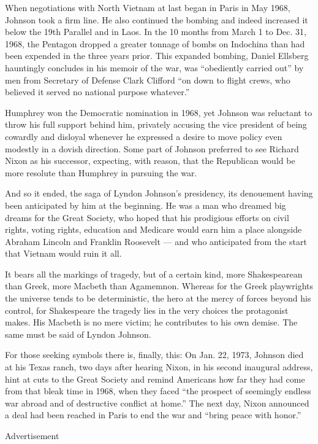 When negotiations with North Vietnam at last began in Paris in May 1968,
Johnson took a firm line. He also continued the bombing and indeed
increased it below the 19th Parallel and in Laos. In the 10 months from
March 1 to Dec. 31, 1968, the Pentagon dropped a greater tonnage of
bombs on Indochina than had been expended in the three years prior. This
expanded bombing, Daniel Ellsberg hauntingly concludes in his memoir of
the war, was ``obediently carried out'' by men from Secretary of Defense
Clark Clifford ``on down to flight crews, who believed it served no
national purpose whatever.''

Humphrey won the Democratic nomination in 1968, yet Johnson was
reluctant to throw his full support behind him, privately accusing the
vice president of being cowardly and disloyal whenever he expressed a
desire to move policy even modestly in a dovish direction. Some part of
Johnson preferred to see Richard Nixon as his successor, expecting, with
reason, that the Republican would be more resolute than Humphrey in
pursuing the war.

And so it ended, the saga of Lyndon Johnson's presidency, its denouement
having been anticipated by him at the beginning. He was a man who
dreamed big dreams for the Great Society, who hoped that his prodigious
efforts on civil rights, voting rights, education and Medicare would
earn him a place alongside Abraham Lincoln and Franklin Roosevelt ---
and who anticipated from the start that Vietnam would ruin it all.

It bears all the markings of tragedy, but of a certain kind, more
Shakespearean than Greek, more Macbeth than Agamemnon. Whereas for the
Greek playwrights the universe tends to be deterministic, the hero at
the mercy of forces beyond his control, for Shakespeare the tragedy lies
in the very choices the protagonist makes. His Macbeth is no mere
victim; he contributes to his own demise. The same must be said of
Lyndon Johnson.

For those seeking symbols there is, finally, this: On Jan. 22, 1973,
Johnson died at his Texas ranch, two days after hearing Nixon, in his
second inaugural address, hint at cuts to the Great Society and remind
Americans how far they had come from that bleak time in 1968, when they
faced ``the prospect of seemingly endless war abroad and of destructive
conflict at home.'' The next day, Nixon announced a deal had been
reached in Paris to end the war and ``bring peace with honor.''

Advertisement

